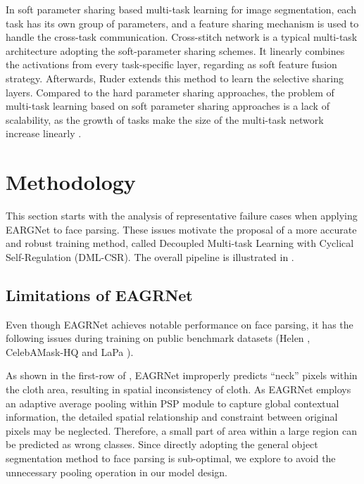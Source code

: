 \documentclass[10pt,twocolumn,letterpaper]{article}
\begin{document}
In soft parameter sharing based multi-task learning for image segmentation, each task has its own group of parameters, and a feature sharing mechanism is used to handle the cross-task communication. Cross-stitch network \cite{Misra_2016_CVPR} is a typical multi-task architecture adopting the soft-parameter sharing schemes. It linearly combines the activations from every task-specific layer, regarding as soft feature fusion strategy. Afterwards, Ruder \etal \cite{Ruder2019LatentMA} extends this method to learn the selective sharing layers. 
Compared to the hard parameter sharing approaches, the problem of multi-task learning based on soft parameter sharing approaches is a lack of scalability, as the growth of tasks make the size of the multi-task network increase linearly \cite{multi_task_survey}.

\section{Methodology}

This section starts with the analysis of representative failure cases when applying EARGNet \cite{te2020edge} to face parsing. These issues motivate the proposal of a more accurate and robust training method, called Decoupled Multi-task Learning with Cyclical Self-Regulation (DML-CSR). The overall pipeline is illustrated in \figureautorefname{ \ref{fig:framwork}}.

\subsection{Limitations of EAGRNet}

Even though EAGRNet \cite{te2020edge} achieves notable performance on face parsing, it has the following issues during training on public benchmark datasets (\eg Helen \cite{helen}, CelebAMask-HQ \cite{CelebAMask-HQ} and LaPa \cite{lapa}). 

As shown in the first-row of \figureautorefname{ \ref{fig:failure_case_of_fcn}}, EAGRNet improperly predicts ``neck'' pixels within the cloth area, resulting in spatial inconsistency of cloth. As EAGRNet employs an adaptive average pooling within PSP module \cite{psp} to capture global contextual information, the detailed spatial relationship and constraint between original pixels may be neglected. Therefore, a small part of area within a large region can be predicted as wrong classes. Since directly adopting the general object segmentation method to face parsing is sub-optimal, we explore to avoid the unnecessary pooling operation in our model design.
\end{document}

